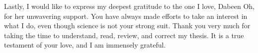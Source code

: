 \begin{otherlanguage}{english}

Lastly, I would like to express my deepest gratitude to the one I love, Dabeen Oh, for her unwavering support. You have always made efforts to take an interest in what I do, even though science is not your strong suit. Thank you very much for taking the time to understand, read, review, and correct my thesis. It is a true testament of your love, and I am immensely grateful.

\endgroup
\newpage
\cleardoublepage

%
%
%
%
%
%
%

\end{otherlanguage}
    